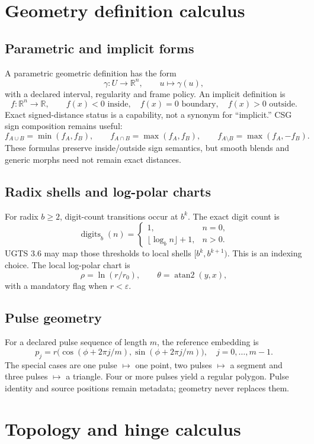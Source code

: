 \documentclass[10pt,a4paper]{article}
\newcommand{\code}[1]{\texttt{\detokenize{#1}}}
\begin{document}
\section{Geometry definition calculus}

\subsection{Parametric and implicit forms}
A parametric geometric definition has the form
\[
\gamma:U\rightarrow\mathbb{R}^n,\qquad u\mapsto\gamma(u),
\]
with a declared interval, regularity and frame policy. An implicit definition is
\[
f:\mathbb{R}^n\rightarrow\mathbb{R},\qquad f(x)<0\text{ inside},\quad f(x)=0\text{ boundary},\quad f(x)>0\text{ outside}.
\]
Exact signed-distance status is a capability, not a synonym for ``implicit.'' CSG sign composition remains useful:
\[
f_{A\cup B}=\min(f_A,f_B),\qquad f_{A\cap B}=\max(f_A,f_B),\qquad f_{A\setminus B}=\max(f_A,-f_B).
\]
These formulas preserve inside/outside sign semantics, but smooth blends and generic morphs need not remain exact distances.

\subsection{Radix shells and log-polar charts}
For radix $b\ge 2$, digit-count transitions occur at $b^k$. The exact digit count is
\[
\operatorname{digits}_b(n)=\begin{cases}1,&n=0,\\ \lfloor\log_b n\rfloor+1,&n>0.\end{cases}
\]
UGTS 3.6 may map those thresholds to local shells $[b^k,b^{k+1})$. This is an indexing choice. The local log-polar chart is
\[
\rho=\ln(r/r_0),\qquad \theta=\operatorname{atan2}(y,x),
\]
with a mandatory \code{core=true} flag when $r<\varepsilon$.

\subsection{Pulse geometry}
For a declared pulse sequence of length $m$, the reference embedding is
\[
p_j=r\bigl(\cos(\phi+2\pi j/m),\sin(\phi+2\pi j/m)\bigr),\quad j=0,\ldots,m-1.
\]
The special cases are one pulse $\mapsto$ one point, two pulses $\mapsto$ a segment and three pulses $\mapsto$ a triangle. Four or more pulses yield a regular polygon. Pulse identity and source positions remain metadata; geometry never replaces them.

\section{Topology and hinge calculus}
\end{document}
